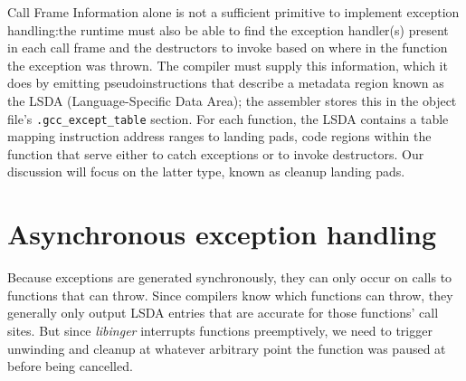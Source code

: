 Call Frame Information alone is not a sufficient primitive to implement exception
handling:\@ the runtime must also be able to find the exception handler(s) present in
each call frame and the destructors to invoke based on where in the function the
exception was thrown.  The compiler must supply this information, which it does by
emitting pseudoinstructions that describe a metadata region known as the LSDA
(Language-Specific Data Area); the assembler stores this in the object file's
\texttt{.gcc\_except\_table} section.  For each function, the LSDA contains a table
mapping instruction address ranges to landing pads, code regions within the function
that serve either to catch exceptions or to invoke destructors.  Our discussion will
focus on the latter type, known as cleanup landing pads.


\section{Asynchronous exception handling}

Because exceptions are generated synchronously, they can only occur on calls to
functions that can throw.  Since compilers know which functions can throw, they
generally only output LSDA entries that are accurate for those functions' call sites.
But since \textit{libinger} interrupts functions preemptively, we need to trigger
unwinding and cleanup at whatever arbitrary point the function was paused at before
being cancelled.

